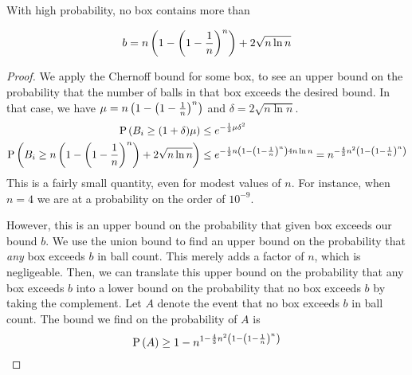 \documentclass[11pt]{article}
\begin{document}
\begin{prop}
    With high probability, no box contains more than

    \begin{equation*}
        b = n \left( 1 - \left( 1 - \frac{1}{n} \right)^n \right) + 2 \sqrt{ n \ln n }
    \end{equation*}
\end{prop}

\begin{proof}
    We apply the Chernoff bound for some box, to see an upper bound on the
    probability that the number of balls in that box exceeds the desired bound.
    In that case, we have $\mu = n \left(1 - \left(1 - \frac{1}{n}\right)^n\right)$
    and $\delta = 2 \sqrt{n \ln n}$.
    \begin{align*}
        \operatorname{P}{\left(B_i \geq (1 + \delta) \mu\right)} &\leq e^{-\frac{1}{3} \mu \delta^2} \\
        \operatorname{P}{\left(B_i \geq n \left(1 - \left(1 - \frac{1}{n}\right)^n\right) + 2 \sqrt{n \ln n}\right)}
        &\leq e^{
            -\frac{1}{3}
            n \left(1 - \left(1 - \frac{1}{n}\right)^n\right)
            4 n \ln n
        }
        = n^{
            -\frac{4}{3} n^2 \left(1 - \left(1 - \frac{1}{n}\right)^n\right)
        }
    \end{align*}
    This is a fairly small quantity, even for modest values of $n$.
    For instance, when $n=4$ we are at a probability on the order of $10^{-9}$.

    However, this is an upper bound on the probability that given box exceeds
    our bound $b$.
    We use the union bound to find an upper bound on the probability that
    \emph{any} box exceeds $b$ in ball count. This merely adds a factor of $n$,
    which is negligeable.
    Then, we can translate this upper bound on the probability that any box
    exceeds $b$ into a lower bound on the probability that no box exceeds $b$
    by taking the complement.
    Let $A$ denote the event that no box exceeds $b$ in ball count.
    The bound we find on the probability of $A$ is
    \begin{equation*}
        \operatorname{P}{\left(A\right)} \geq 1 - n^{
            1 - \frac{4}{3} n^2 \left(1 - \left(1 - \frac{1}{n}\right)^n\right)
        }
    \end{equation*}
\end{proof}
\end{document}
